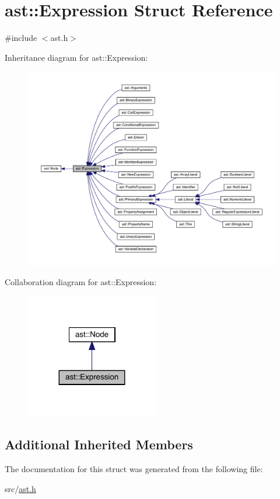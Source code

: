\hypertarget{structast_1_1_expression}{}\section{ast\+:\+:Expression Struct Reference}
\label{structast_1_1_expression}


{\ttfamily \#include $<$ast.\+h$>$}



Inheritance diagram for ast\+:\+:Expression\+:
\nopagebreak
\begin{figure}[H]
\begin{center}
\leavevmode
\includegraphics[width=350pt]{structast_1_1_expression__inherit__graph}
\end{center}
\end{figure}


Collaboration diagram for ast\+:\+:Expression\+:
\nopagebreak
\begin{figure}[H]
\begin{center}
\leavevmode
\includegraphics[width=164pt]{structast_1_1_expression__coll__graph}
\end{center}
\end{figure}
\subsection*{Additional Inherited Members}


The documentation for this struct was generated from the following file\+:\begin{DoxyCompactItemize}
\item 
src/\hyperlink{ast_8h}{ast.\+h}\end{DoxyCompactItemize}
